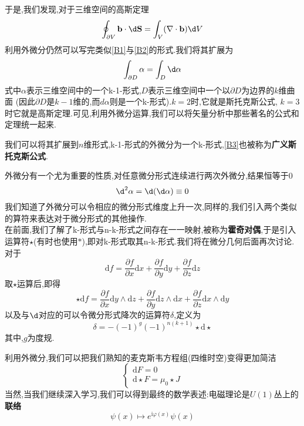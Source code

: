 于是,我们发现,对于三维空间的高斯定理
\begin{equation}
    \oint_{\partial V}\mathbf{b}\cdot \d\mathbf{S}=\int_V(\nabla\cdot\mathbf{b})\d V
\end{equation}
利用外微分仍然可以写完类似\ref{B1}与\ref{B2}的形式.我们将其扩展为
\begin{equation}\label{B3}
    \int_{\partial D}\alpha=\int_D\d\alpha
\end{equation}
式中$\alpha$表示三维空间中的一个k-1-形式,$D$表示三维空间中一个以$\partial D$为边界的$k$维曲面 (因此$\partial D$是$k-1$维的,而$d\alpha$则是一个k-形式).$k=2$时,它就是斯托克斯公式, $k=3$时它就是高斯定理.可见,利用外微分运算,我们可以将矢量分析中那些著名的公式和定理统一起来.

我们可以将其扩展到$ n $维形式,k-1-形式的外微分为一个k-形式,\ref{B3}也被称为\textbf{广义斯托克斯公式}.

外微分有一个尤为重要的性质,对任意微分形式连续进行两次外微分,结果恒等于0
\begin{equation}
    \d^2\alpha=\d(\d\alpha)\equiv0
\end{equation}
我们知道了外微分可以令相应的微分形式维度上升一次,同样的,我们引入两个类似的算符来表达对于微分形式的其他操作.\\
在前面,我们了解了k-形式与n-k-形式之间存在一一映射,被称为\textbf{霍奇对偶},于是引入运算符$\star$(有时也使用$*$),即对k-形式取其n-k-形式.我们将在微分几何后面再次讨论.对于
$$\mathrm{d}f=\frac{\partial f}{\partial x}\mathrm{d}x+\frac{\partial f}{\partial y}\mathrm{d}y+\frac{\partial f}{\partial z}\mathrm{d}z$$
取$\star$运算后,即得
\begin{equation}
    \star\mathrm{d}f=\frac{\partial f}{\partial x}\mathrm{d}y\wedge\mathrm{d}z+\frac{\partial f}{\partial y}\mathrm{d}z\wedge\mathrm{d}x+\frac{\partial f}{\partial z}\mathrm{d}x\wedge\mathrm{d}y
\end{equation}
以及与$\d$对应的可以令微分形式降次的运算符$\delta$,定义为
\begin{equation}
    \delta=-(-1)^g(-1)^{n(k+1)}\star\mathrm{d}\star
\end{equation}
其中,$g$为度规.

利用外微分,我们可以把我们熟知的麦克斯韦方程组(四维时空)变得更加简洁
\begin{equation}
    \begin{cases} \mathrm{d}F=0\\ \mathrm{d}\star F=\mu_0\star J \end{cases}
\end{equation}
当然,当我们继续深入学习,我们可以得到最终的数学表述:电磁理论是$U(1)$丛上的\textbf{联络}
\begin{equation}
    \psi(x)\mapsto e^{\mathrm{i}\varphi(x)}\psi(x)
\end{equation}
